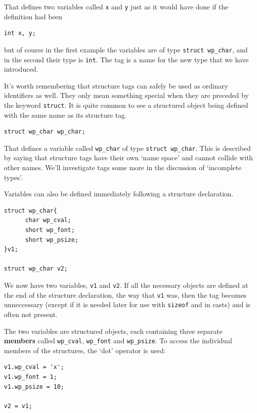   That defines two variables called \texttt{x} and \texttt{y} just
   as it would have done if the definition had been


  \begin{Verbatim}
int x, y;
\end{Verbatim}

  but of course in the first example the variables are of type \texttt{struct
   wp\_char}, and in the second their type is \texttt{int}. The tag is
   a name for the new type that we have introduced.


  It's worth remembering that structure tags can safely be used as ordinary
   identifiers as well. They only mean something special when they are preceded
   by the keyword \texttt{struct}. It is quite common to see a structured
   object being defined with the same name as its structure tag.


  \begin{Verbatim}
struct wp_char wp_char;
\end{Verbatim}

  That defines a variable called \texttt{wp\_char} of type \texttt{struct
   wp\_char}. This is described by saying that structure tags have their
   own `name space' and cannot collide with other names. We'll
   investigate tags some more in the discussion of `incomplete
   types'.


  Variables can also be defined immediately following a structure
   declaration.


  \begin{Verbatim}
struct wp_char{
      char wp_cval;
      short wp_font;
      short wp_psize;
}v1;

struct wp_char v2;
\end{Verbatim}

  We now have two variables, \texttt{v1} and \texttt{v2}. If all the
   necessary objects are defined at the end of the structure declaration, the
   way that \texttt{v1} was, then the tag becomes unneccessary (except if
   it is needed later for use with \texttt{sizeof} and in casts) and is
   often not present.


  The two variables are structured objects, each containing three separate
   \textbf{members} called \texttt{wp\_cval}, \texttt{wp\_font} and
   \texttt{wp\_psize}. To access the individual members of the structures,
   the `dot' operator is used:


  \begin{Verbatim}
v1.wp_cval = 'x';
v1.wp_font = 1;
v1.wp_psize = 10;

v2 = v1;
\end{Verbatim}

